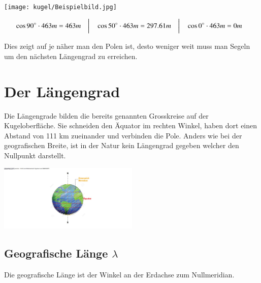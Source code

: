 \begin{refsection}
\begin{center}
        \texttt{[image: kugel/Beispielbild.jpg]}
\end{center}

\[
\begin{aligned}
&\cos 90^\circ \cdot 463m = 463m
&
&\text{\bigg \vert}
&
&\cos 50^\circ \cdot 463m = 297.61m
&
&\text{\bigg \vert}
&
&\cos 0^\circ \cdot 463m = 0m
\end{aligned}
\]

Dies zeigt auf je näher man den Polen ist, desto weniger weit muss man Segeln um den nächsten Längengrad zu erreichen.

\section{Der Längengrad}
Die Längengrade bilden die bereits genannten Grosskreise auf der Kugeloberfläche.
Sie schneiden den Äquator im rechten Winkel, haben dort einen Abstand von 111 km zueinander und verbinden die Pole. Anders wie bei der geografischen Breite, ist in der Natur kein Längengrad gegeben welcher den Nullpunkt darstellt.

\begin{center}
        \includegraphics[width=0.5\textwidth]{kugel/1Langengrad.jpg}
\end{center}


\subsection{Geografische Länge $\lambda$}
\begin{definition}
Die geografische Länge ist der Winkel an der Erdachse zum Nullmeridian.
\end{definition}


\end{refsection}

